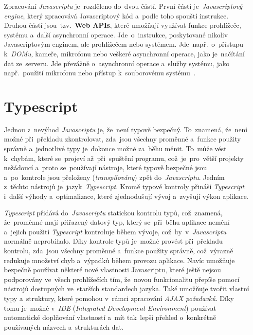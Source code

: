 \documentclass[11pt,a4paper]{report}
\begin{document}
            Zpracování \emph{Javascriptu} je~rozděleno do~dvou částí. První částí je~\emph{Javascriptový engine}, který zpracovává Javascriptový kód a~podle toho spouští instrukce. Druhou částí jsou~tzv.~\textbf{Web APIs}, které umožňují využívat funkce prohlížeče, systému a~další {asynchronní} operace. Jde~o~instrukce, poskytované nikoliv Javascriptovým enginem, ale prohlížečem nebo systémem. Jde~např.~o~přístupu k~\emph{DOMu}, kameře, mikrofonu nebo veškeré asynchronní operace, jako je~načítání dat ze~serveru. Jde převážně o~asynchronní operace a~služby systému, jako např.~použití mikrofonu nebo přístup k~souborovému systému~\cite{kantor_javascript}.

        \section{Typescript}
            Jednou z~nevýhod \emph{Javascriptu} je, že~není typově bezpečný. To~znamená, že~není možné při~překladu zkontrolovat, zda~jsou všechny proměnné a~funkce použity správně a~jednotlivé typy je~dokonce možné za~běhu měnit. To~může vést k~chybám, které se~projeví až~při~spuštění programu, což~je~pro~větší projekty nežádoucí a~proto se~používají nástroje, které typově bezpečné jsou a~po~kontrole jsou přeloženy (\emph{transpilovány}) zpět do~\emph{Javascriptu}. Jedním z~těchto nástrojů je~jazyk~\emph{Typescript}. Kromě typové kontroly přináší \emph{Typescript} i~další výhody a~optimalizace, které zjednodušují vývoj a~zvyšují výkon aplikace.

            \emph{Typescript} přidává do~\emph{Javascriptu} statickou kontrolu typů, což~znamená, že~proměnné mají přiřazený datový typ, který se~při~běhu aplikace nemění a~jejich použití \emph{Typescript} kontroluje během vývoje, což~by~v~\emph{Javascriptu} normálně neprobíhalo. Díky kontrole typů je~možné provést při~překladu kontrolu, zda~jsou všechny proměnné a~funkce použity správně, což~výrazně redukuje množství chyb a~výpadků během provozu aplikace. Navíc umožňuje bezpečně používat některé nové vlastnosti Javascriptu, které ještě nejsou podporovány ve~všech prohlížečích tím, že~novou funkcionalitu přepíše pomocí nástrojů dostupných ve~starších standardech jazyka. Také umožňuje tvořit vlastní typy a~struktury, které pomohou v~rámci zpracování \emph{AJAX požadavků}. Díky tomu je~možné v~\emph{IDE} (\emph{Integrated Development Environment}) používat automatické doplňování vlastností a~mít tak~lepší přehled o~konkrétně používaných názvech a~strukturách dat.
\end{document}
